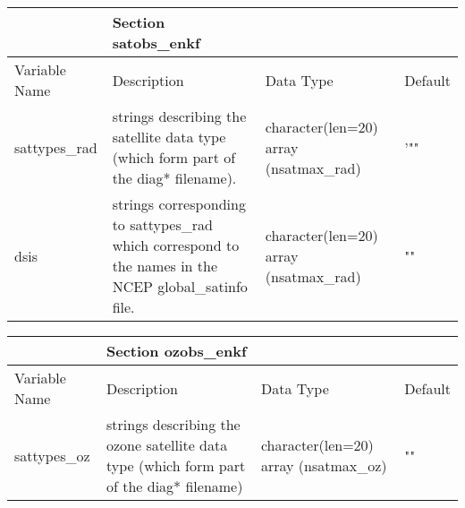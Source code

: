 \begin{table}[htbp]
\centering
\begin{tabular}{p{3cm}p{6cm}p{3cm}p{1.5cm}}
& Section \textbf{satobs\_enkf}&&\\
\hline
Variable Name&Description&Data Type&Default\\
\hline
sattypes\_rad&strings describing the satellite data type (which form part of the diag* filename).& 
character(len=20) array (nsatmax\_rad) & '"" \\
dsis&strings corresponding to sattypes\_rad which correspond to the names in the NCEP global\_satinfo file.&
character(len=20) array (nsatmax\_rad)&""\\
\hline
\end{tabular}
\end{table} 

\begin{table}[htbp]
\centering
\begin{tabular}{p{3cm}p{6cm}p{3cm}p{1.5cm}}
&Section \textbf{ozobs\_enkf}&&\\
\hline
Variable Name&Description&Data Type&Default\\
\hline
sattypes\_oz&strings describing the ozone satellite data type (which form part of the diag* filename)&
character(len=20) array (nsatmax\_oz)&""\\
\hline
\end{tabular}
\end{table} 
